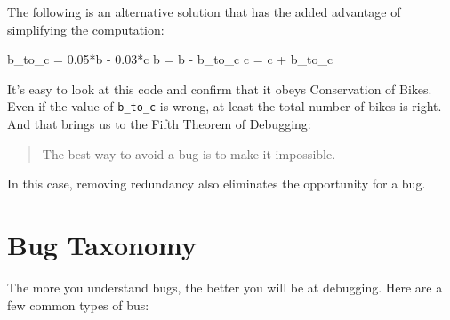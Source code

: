 
The following is an alternative solution that
has the added advantage of simplifying the computation:

\begin{code}
b_to_c = 0.05*b - 0.03*c
b = b - b_to_c
c = c + b_to_c
\end{code}

It's easy to look at this code and confirm that it obeys Conservation
of Bikes.  Even if the value of \lstinline{b_to_c} is wrong, at least the total
number of bikes is right.  And that brings us to the Fifth Theorem of
Debugging:

\begin{quote}
The best way to avoid a bug is to make it impossible.
\end{quote}

In this case, removing redundancy also eliminates the opportunity for  a bug.

\section{Bug Taxonomy}

The more you understand bugs, the better you will be at debugging. Here are a few common types of bus:


